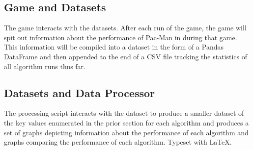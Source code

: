 \documentclass[12pt]{article}
\begin{document}
    \subsection*{Game and Datasets}
      The game interacts with the datasets. After each run of the game, the game will spit out information about the performance of Pac-Man in during that game. This information will be compiled into a dataset in the form of a Pandas DataFrame and then appended to the end of a CSV file tracking the statistics of all algorithm runs thus far.
    \subsection*{Datasets and Data Processor}
      The processing script interacts with the dataset to produce a smaller dataset of the key values enumerated in the prior section for each algorithm and produces a set of graphs depicting information about the performance of each algorithm and graphs comparing the performance of each algorithm. 
  \vfill
  Typeset with \LaTeX.
\end{document}
